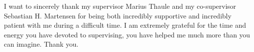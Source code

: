 I want to sincerely thank my supervisor Marius Thaule and my co-supervisor Sebastian H. Martensen for being both incredibly supportive and incredibly patient with me during a difficult time. I am extremely grateful for the time and energy you have devoted to supervising, you have helped me much more than you can imagine. Thank you.
